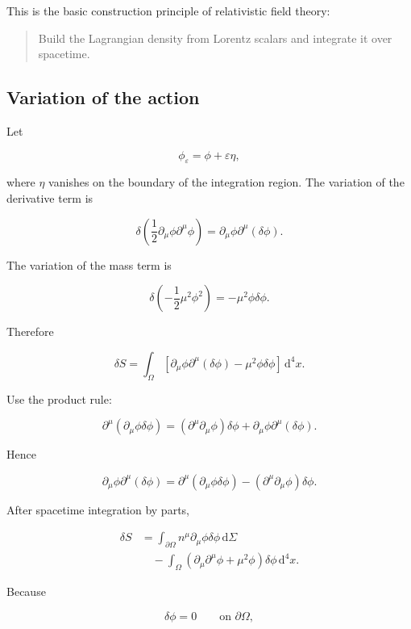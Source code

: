 This is the basic construction principle of relativistic field theory:

\begin{quote}
Build the Lagrangian density from Lorentz scalars and integrate it over spacetime.
\end{quote}

\subsection{Variation of the action}

Let

\[
\phi_{\varepsilon}
=
\phi+\varepsilon\eta,
\]

where \(\eta\) vanishes on the boundary of the integration region. The variation of the derivative term is

\[
\delta
\left(
\frac{1}{2}
\partial_{\mu}\phi\partial^{\mu}\phi
\right)
=
\partial_{\mu}\phi\partial^{\mu}(\delta\phi).
\]

The variation of the mass term is

\[
\delta
\left(
-\frac{1}{2}\mu^{2}\phi^{2}
\right)
=
-\mu^{2}\phi\delta\phi.
\]

Therefore

\[
\delta S
=
\int_{\Omega}
\left[
\partial_{\mu}\phi\partial^{\mu}(\delta\phi)
-
\mu^{2}\phi\delta\phi
\right]
\,\mathrm{d}^{4}x.
\]

Use the product rule:

\[
\partial^{\mu}
\left(
\partial_{\mu}\phi\delta\phi
\right)
=
\left(
\partial^{\mu}\partial_{\mu}\phi
\right)
\delta\phi
+
\partial_{\mu}\phi
\partial^{\mu}(\delta\phi).
\]

Hence

\[
\partial_{\mu}\phi
\partial^{\mu}(\delta\phi)
=
\partial^{\mu}
\left(
\partial_{\mu}\phi\delta\phi
\right)
-
\left(
\partial^{\mu}\partial_{\mu}\phi
\right)
\delta\phi.
\]

After spacetime integration by parts,

\[
\begin{aligned}
\delta S
&=
\int_{\partial\Omega}
 n^{\mu}
\partial_{\mu}\phi
\delta\phi
\,\mathrm{d}\Sigma\\
&\quad-
\int_{\Omega}
\left(
\partial_{\mu}\partial^{\mu}\phi
+
\mu^{2}\phi
\right)
\delta\phi
\,\mathrm{d}^{4}x.
\end{aligned}
\]

Because

\[
\delta\phi=0
\qquad
\text{on }\partial\Omega,
\]

